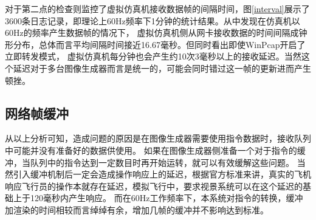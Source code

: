 \par
对于第二点的检查则监控了虚拟仿真机接收数据帧的间隔时间，图\ref{interval}展示了3600条日志记录，即理论上60Hz频率下1分钟的统计结果。从中发现在仿真机以60Hz的频率产生数据帧的情况下，
虚拟仿真机侧从网卡接收数据的时间间隔成钟形分布，总体而言平均间隔时间接近16.67毫秒。但同时看出即使WinPcap开启了立即转发模式，
虚拟仿真机每分钟也会产生约10次3毫秒以上的接收延迟。当然这个延迟对于多台图像生成器而言是统一的，可能会同时错过这一帧的更新进而产生顿挫。

\subsection{网络帧缓冲}
从以上分析可知，造成问题的原因是在图像生成器需要使用指令数据时，接收队列中可能并没有准备好的数据供使用。
如果在图像生成器侧准备一个对于指令的缓冲，当队列中的指令达到一定数目时再开始运转，就可以有效缓解这些问题。
当然引入缓冲机制后一定会造成操作响应上的延迟，根据官方标准来讲，真实的飞机响应飞行员的操作本就存在延迟，模拟飞行中，要求视景系统可以在这个延迟的基础上于120毫秒内产生响应。
而在60Hz工作频率下，本系统对指令的转换，缓冲加渲染的时间相较而言绰绰有余，增加几帧的缓冲并不影响达到标准。

